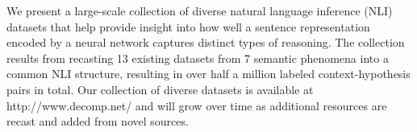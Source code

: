 We present a large-scale collection of diverse natural language inference (NLI) datasets that help provide insight into how well a sentence representation encoded by a neural network captures distinct types of reasoning. The collection results from recasting 13 existing datasets from 7 semantic phenomena into a common NLI structure, resulting in over half a million labeled context-hypothesis pairs in total. Our collection of diverse datasets is available at http://www.decomp.net/ and will grow over time as additional resources are recast and added from novel sources.
